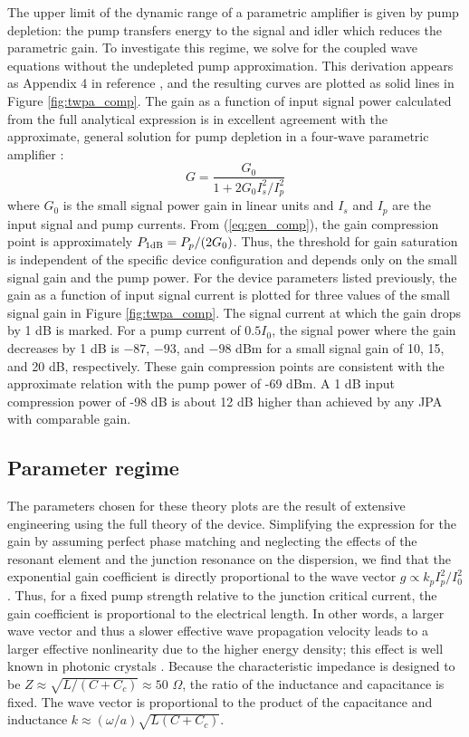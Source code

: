The upper limit of the dynamic range of a parametric amplifier is given by pump depletion: the pump transfers energy to the signal and idler which reduces the parametric gain. To investigate this regime, we solve for the coupled wave equations without the undepleted pump approximation. This derivation appears as Appendix 4 in reference \cite{OBrien2014}, and the resulting curves are plotted as solid lines in Figure \ref{fig:twpa_comp}. The gain as a function of input signal power calculated from the full analytical expression is in excellent agreement with the approximate, general solution for pump depletion in a four-wave parametric amplifier \cite{kylemark_semi-analytic_2006}:
\begin{equation}
G=\frac{G_0}{1+2 G_0 I_{s}^2/I_{p}^2} \label{eq:gen_comp}
\end{equation}
where $G_0$ is the small signal power gain in linear units and $I_{s}$ and $I_{p}$ are the input signal and pump currents. From (\ref{eq:gen_comp}), the gain compression point is approximately $P_{1 \rm dB}=P_{p}/(2 G_0)$. Thus, the threshold for gain saturation is independent of the specific device configuration and depends only on the small signal gain and the pump power. For the device parameters listed previously, the gain as a function of input signal current is plotted for three values of the small signal gain in Figure \ref{fig:twpa_comp}. The signal current at which the gain drops by 1 dB is marked. For a pump current of $0.5 I_0$, the signal power where the gain decreases by 1 dB is $-87$, $-93$, and $-98$ dBm for a small signal gain of 10, 15, and 20 dB, respectively. These gain compression points are consistent with the approximate relation with the pump power of -69 dBm.  A 1 dB input compression power of -98 dB is about 12 dB higher than achieved by any JPA with comparable gain.

\subsection{Parameter regime}\label{s:twpa_param}

The parameters chosen for these theory plots are the result of extensive engineering using the full theory of the device.  Simplifying the expression for the gain by assuming perfect phase matching and neglecting the effects of the resonant element and the junction resonance on the dispersion, we find that the exponential gain coefficient is directly proportional to the wave vector $g\propto k_p I_p^2/I_0^2$. Thus, for a fixed pump strength relative to the junction critical current, the gain coefficient is proportional to the electrical length. In other words, a larger wave vector and thus a slower effective wave propagation velocity leads to a larger effective nonlinearity due to the higher energy density; this effect is well known in photonic crystals \cite{soljacic_photonic-crystal_2002}. Because the characteristic impedance is designed to be $Z \approx \sqrt{L/(C+C_c)} \approx 50$ $\Omega$, the ratio of the inductance and capacitance is fixed. The wave vector is proportional to the product of the capacitance and inductance $k \approx (\omega/a) \sqrt{L(C+C_c)}$.

